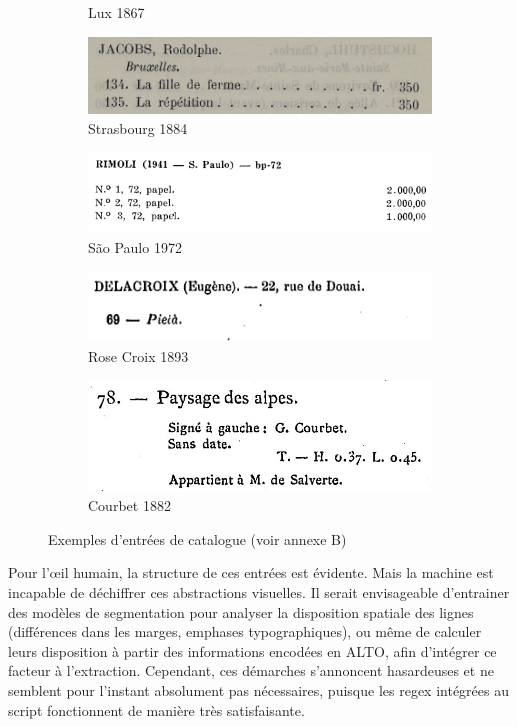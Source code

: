 \documentclass[a4paper,12pt,twoside]{book}
\begin{document}
\begin{figure}[ht]
\begin{subfigure}{0.5\textwidth}
		\centering
		\caption{Lux 1867}
	\end{subfigure}
	\begin{subfigure}{0.5\textwidth}
		\includegraphics[scale=0.5]{strasbourg1884.png}
		\centering
		\caption{Strasbourg 1884}
	\end{subfigure}
	\begin{subfigure}{0.5\textwidth}
		\includegraphics[scale=0.5]{saopaulo1972.png}
		\centering
		\caption{São Paulo 1972}
	\end{subfigure}
	\begin{subfigure}{0.5\textwidth}
		\includegraphics[scale=0.5]{rosecroix1893.png}
		\centering
		\caption{Rose Croix 1893}
	\end{subfigure}
	\begin{subfigure}{0.5\textwidth}
		\includegraphics[scale=0.5]{courbet1882.png}
		\centering
		\caption{Courbet 1882}
	\end{subfigure}
\caption{Exemples d'entrées de catalogue (voir annexe B)}
\label{entrees}
\end{figure}


Pour l'œil humain, la structure de ces entrées est évidente. Mais la machine est incapable de déchiffrer ces abstractions visuelles. Il serait envisageable d'entrainer des modèles de segmentation pour analyser la disposition spatiale des lignes (différences dans les marges, emphases typographiques), ou même de calculer leurs disposition à partir des informations encodées en ALTO, afin d'intégrer ce facteur à l'extraction. Cependant, ces démarches s'annoncent hasardeuses et ne semblent pour l'instant absolument pas nécessaires, puisque les regex intégrées au script fonctionnent de manière très satisfaisante. 
\end{document}
